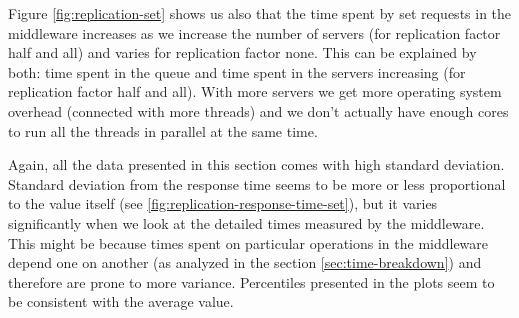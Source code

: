 \documentclass[11pt]{article}
\begin{document}
Figure \ref{fig:replication-set} shows us also that the time spent by set requests in the middleware increases as we increase the number of servers (for replication factor half and all) and varies for replication factor none. This can be explained by both: time spent in the queue and time spent in the servers increasing (for replication factor half and all). With more servers we get more operating system overhead (connected with more threads) and we don't actually have enough cores to run all the threads in parallel at the same time. 

Again, all the data presented in this section comes with high standard deviation. Standard deviation from the response time seems to be more or less proportional to the value itself (see \ref{fig:replication-response-time-set}), but it varies significantly when we look at the detailed times measured by the middleware. This might be because times spent on particular operations in the middleware depend one on another (as analyzed in the section \ref{sec:time-breakdown}) and therefore are prone to more variance. Percentiles presented in the plots seem to be consistent with the average value.
\end{document}
